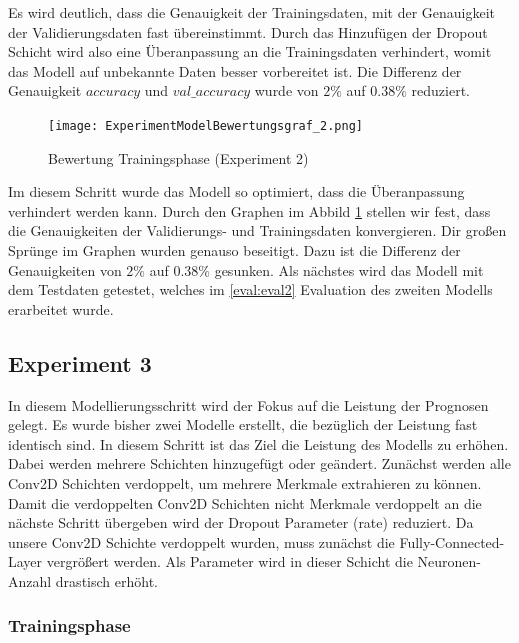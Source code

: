 \documentclass[12pt]{scrreprt}
\begin{document}
Es wird deutlich, dass die Genauigkeit der Trainingsdaten, mit der Genauigkeit der Validierungsdaten fast übereinstimmt. Durch das Hinzufügen der Dropout Schicht wird also eine Überanpassung an die Trainingsdaten verhindert, womit das Modell auf unbekannte Daten besser vorbereitet ist. Die Differenz der Genauigkeit $accuracy$ und $val\_accuracy$ wurde von $2\%$ auf  $0.38\%$ reduziert.
\begin{figure}[h!]
	\centering
	\texttt{[image: ExperimentModelBewertungsgraf\_2.png]}
	\caption{ Bewertung Trainingsphase \cite{HK22}(Experiment 2)}
	\label{fig:fig28}
\end{figure}

Im diesem Schritt wurde das Modell so optimiert, dass die Überanpassung verhindert werden kann. Durch den Graphen im Abbild \ref{fig:fig28} stellen wir fest, dass die Genauigkeiten der Validierungs- und Trainingsdaten konvergieren. Dir großen Sprünge im Graphen wurden genauso beseitigt. Dazu ist die Differenz der Genauigkeiten von $2\%$ auf $0.38\%$ gesunken. Als nächstes wird das Modell mit dem Testdaten getestet, welches im \ref{eval:eval2} Evaluation des zweiten Modells erarbeitet wurde.

\subsection{Experiment 3}\label{model:ep3}

In diesem Modellierungsschritt wird der Fokus auf die Leistung der Prognosen gelegt. Es wurde bisher zwei Modelle erstellt, die bezüglich der Leistung  fast identisch sind. In diesem Schritt ist das Ziel die Leistung des Modells zu erhöhen. Dabei werden mehrere Schichten hinzugefügt oder geändert. Zunächst werden alle Conv2D Schichten verdoppelt, um mehrere Merkmale extrahieren zu können. Damit die verdoppelten Conv2D Schichten nicht Merkmale verdoppelt an die nächste Schritt übergeben wird der Dropout Parameter (rate) reduziert. Da unsere Conv2D Schichte verdoppelt wurden, muss zunächst die Fully-Connected-Layer vergrößert werden. Als Parameter wird in dieser Schicht die Neuronen-Anzahl drastisch erhöht.

\subsubsection{Trainingsphase}
\end{document}
